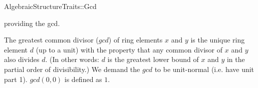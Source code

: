 \begin{ccRefConcept}{AlgebraicStructureTraits::Gcd}

\ccDefinition

 providing the gcd. 

The greatest common divisor ($gcd$) of ring elements $x$ and $y$ is the unique 
ring element $d$ (up to a unit) with the property that any common divisor of 
$x$ and $y$ also divides $d$. (In other words: $d$ is the greatest lower bound 
of $x$ and $y$ in the partial order of divisibility.) We demand the $gcd$ to be 
unit-normal (i.e. have unit part 1). $gcd(0,0)$ is defined as $1$.
 
\ccRefines 


\ccTypes

\ccGlue
{}\ccGlue
{}

\ccOperations
{}


\ccSeeAlso


\end{ccRefConcept} 

